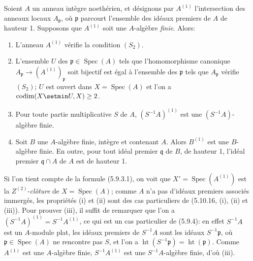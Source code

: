 \begin{proposition}[5.10.17]
\label{IV.2.s5.10.17-fr}
Soient $A$ un anneau intègre noethérien, et désignons par $A^{(1)}$
l'intersection des anneaux locaux $A_{\mathfrak p}$, où $\mathfrak p$
parcourt l'ensemble des idéaux premiers de $A$ de hauteur 1. Supposons que
$A^{(1)}$ soit une $A$-algèbre \emph{finie}. Alors:
\begin{enumerate}
\item[\textup{(i)}] L'anneau $A^{(1)}$ vérifie la condition $(S_2)$.
\item[\textup{(ii)}] L'ensemble $U$ des $\mathfrak p\in\operatorname{Spec}(A)$ tels
que l'homomorphisme canonique
$A_{\mathfrak p}\to(A^{(1)})_{\mathfrak p}$ soit bijectif est égal à
l'ensemble des $\mathfrak p$ tels que $A_{\mathfrak p}$ vérifie $(S_2)$; $U$
est ouvert dans $X=\operatorname{Spec}(A)$ et l'on a
$\operatorname{codim}(X\setmin U,X)\geq2$.
\item[\textup{(iii)}] Pour toute partie multiplicative $S$ de $A$, $(S^{-1}A)^{(1)}$
est une $(S^{-1}A)$-algèbre finie.
\item[\textup{(iv)}] Soit $B$ une $A$-algèbre finie, intègre et contenant $A$. Alors
$B^{(1)}$ est une $B$-algèbre finie. En outre, pour tout idéal premier
$\mathfrak q$ de $B$, de hauteur 1, l'idéal premier $\mathfrak q\cap A$ de
$A$ est de hauteur 1.
\end{enumerate}
\end{proposition}

Si l'on tient compte de la formule (5.9.3.1), on voit que
$X'=\operatorname{Spec}(A^{(1)})$ est la $Z^{(2)}$-\emph{clôture} de
$X=\operatorname{Spec}(A)$; comme $A$ n'a pas d'idéaux premiers associés
immergés, les propriétés (i) et (ii) sont des cas particuliers de (5.10.16,
(i), (ii) et (iii)). Pour prouver (iii), il suffit de remarquer que l'on a
$(S^{-1}A)^{(1)}=S^{-1}A^{(1)}$, ce qui est un cas particulier de (5.9.4): en
effet $S^{-1}A$ est un $A$-module plat, les idéaux premiers de $S^{-1}A$ sont
les idéaux $S^{-1}\mathfrak p$, où $\mathfrak p\in\operatorname{Spec}(A)$ ne
rencontre pas $S$, et l'on a
$\operatorname{ht}(S^{-1}\mathfrak p)=\operatorname{ht}(\mathfrak p)$. Comme
$A^{(1)}$ est une $A$-algèbre finie, $S^{-1}A^{(1)}$ est une
$S^{-1}A$-algèbre finie, d'où (iii).

